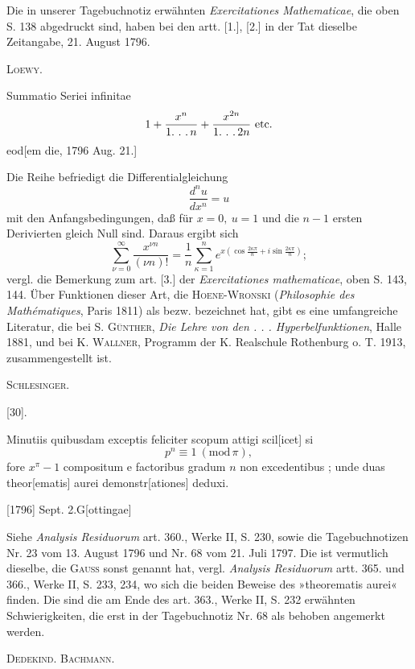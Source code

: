 \indent Die in unserer Tagebuchnotiz erwähnten \textit{Exercitationes Mathematicae}, die oben S. 138 abgedruckt sind, haben bei den artt. [1.], [2.] in der Tat dieselbe Zeitangabe, 21. August 1796.
\par\noindent\hfill\textsc{Loewy.}
\par\endgroup

\clearpage{}
\indent Summatio Seriei infinitae
\[
1+\frac{x^n}{1\ldotp\,\ldotp\,\ldotp n}+\frac{x^{2n}}{1\ldotp\,\ldotp\,\ldotp2n}\ \text{etc.}
\]
\noindent\hfill eod[em die, 1796 Aug. 21.]

\medskip\begingroup\small
\indent Die Reihe befriedigt die Differentialgleichung
\[
\frac{d^n u}{dx^n}=u
\]
\noindent mit den Anfangsbedingungen, daß für \(x=0,\ u=1\) und die \(n-1\) ersten Derivierten gleich Null sind. Daraus ergibt sich
\[
\sum_{\nu=0}^{\infty}\frac{x^{\nu n}}{(\nu n)!}=\frac1n\sum_{\kappa=1}^{n}e^{x\left(\cos\frac{2\kappa\pi}{n}+i\sin\frac{2\kappa\pi}{n}\right)};
\]
\noindent vergl. die Bemerkung zum art. [3.] der \textit{Exercitationes mathematicae}, oben S. 143, 144. Über Funktionen dieser Art, die \textsc{Hoene-Wronski} (\textit{Philosophie des Mathématiques}, Paris 1811) als  bezw.  bezeichnet hat, gibt es eine umfangreiche Literatur, die bei S. \textsc{Günther}, \textit{Die Lehre von den . . . Hyperbelfunktionen}, Halle 1881, und bei K. \textsc{Wallner}, Programm der K. Realschule Rothenburg o. T. 1913, zusammengestellt ist.
\par\noindent\hfill\textsc{Schlesinger.}
\par\endgroup

\par\medskip{}\begin{center}[30].\end{center}
\indent Minutiis quibusdam exceptis feliciter scopum attigi scil[icet] si
\[
p^n\equiv1\ (\mathrm{mod}\,\pi),
\]
\noindent fore \(x^\pi-1\) compositum e factoribus gradum \(n\) non excedentibus ; unde duas theor[ematis] aurei demonstr[ationes] deduxi.
\par\noindent\hfill[1796] Sept. 2.\quad G[ottingae]

\medskip\begingroup\small
\indent Siehe \textit{Analysis Residuorum} art. 360., Werke II, S. 230, sowie die Tagebuchnotizen Nr. 23 vom 13. August 1796 und Nr. 68 vom 21. Juli 1797. Die  ist vermutlich dieselbe, die \textsc{Gauss} sonst  genannt hat, vergl. \textit{Analysis Residuorum} artt. 365. und 366., Werke II, S. 233, 234, wo sich die beiden Beweise des »theorematis aurei« finden. Die  sind die am Ende des art. 363., Werke II, S. 232 erwähnten Schwierigkeiten, die erst in der Tagebuchnotiz Nr. 68 als behoben angemerkt werden.
\par\noindent\hfill\textsc{Dedekind. Bachmann.}
\par\endgroup
